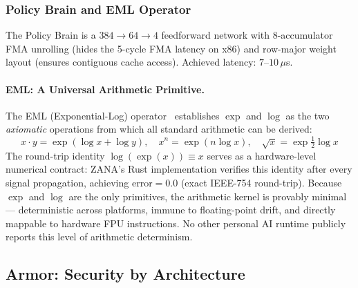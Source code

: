 \documentclass[12pt,a4paper]{article}
\begin{document}
\subsubsection{Policy Brain and EML Operator}

The Policy Brain is a $384\!\to\!64\!\to\!4$ feedforward network with 8-accumulator FMA unrolling
(hides the 5-cycle FMA latency on x86) and row-major weight layout (ensures contiguous cache access).
Achieved latency: $7$--$10\,\mu$s.

\paragraph{EML: A Universal Arithmetic Primitive.}
The EML (Exponential-Log) operator~\cite{odrzywolekEML} establishes $\exp$ and $\log$ as the two
\emph{axiomatic} operations from which all standard arithmetic can be derived:
\[
  x \cdot y = \exp(\log x + \log y), \quad
  x^n = \exp(n \log x), \quad
  \sqrt{x} = \exp\!\tfrac{1}{2}\log x
\]
The round-trip identity $\log(\exp(x)) \equiv x$ serves as a hardware-level numerical contract:
ZANA's Rust implementation verifies this identity after every signal propagation, achieving
$\mathrm{error} = 0.0$ (exact IEEE-754 round-trip). Because $\exp$ and $\log$ are the only
primitives, the arithmetic kernel is provably minimal --- deterministic across platforms, immune
to floating-point drift, and directly mappable to hardware FPU instructions. No other personal AI
runtime publicly reports this level of arithmetic determinism.

\subsection{Armor: Security by Architecture}
\label{sec:armor}
\end{document}
